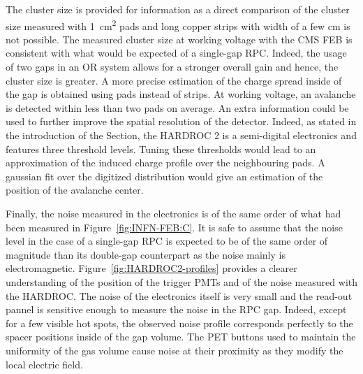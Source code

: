 	The cluster size is provided for information as a direct comparison of the cluster size measured with \SI{1}{cm^2} pads and long copper strips with width of a few \si{cm} is not possible. The measured cluster size at working voltage with the CMS FEB is consistent with what would be expected of a single-gap RPC. Indeed, the usage of two gaps in an OR system allows for a stronger overall gain and hence, the cluster size is greater. A more precise estimation of the charge spread inside of the gap is obtained using pads instead of strips. At working voltage, an avalanche is detected within less than two pads on average. An extra information could be used to further improve the spatial resolution of the detector. Indeed, as stated in the introduction  of the Section, the HARDROC 2 is a semi-digital electronics and features three threshold levels. Tuning these thresholds would lead to an approximation of the induced charge profile over the neighbouring pads. A gaussian fit over the digitized distribution would give an estimation of the position of the avalanche center.
	
	Finally, the noise measured in the electronics is of the same order of what had been measured in Figure~\ref{fig:INFN-FEB:C}. It is safe to assume that the noise level in the case of a single-gap RPC is expected to be of the same order of magnitude than its double-gap counterpart as the noise mainly is electromagnetic. Figure~\ref{fig:HARDROC2-profiles} provides a clearer understanding of the position of the trigger PMTs and of the noise measured with the HARDROC. The noise of the electronics itself is very small and the read-out pannel is sensitive enough to measure the noise in the RPC gap. Indeed, except for a few visible hot spots, the observed noise profile corresponds perfectly to the spacer positions inside of the gap volume. The PET buttons used to maintain the uniformity of the gas volume cause noise at their proximity as they modify the local electric field.
	 
